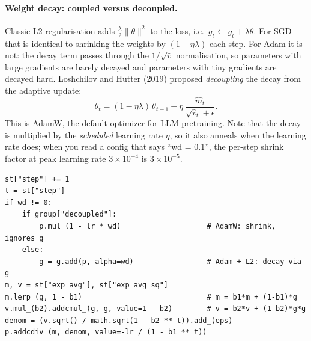 \paragraph{Weight decay: coupled versus decoupled.} Classic L2 regularisation adds
$\tfrac{\lambda}{2}\|\theta\|^2$ to the loss, i.e.\ $g_t\leftarrow g_t+\lambda\theta$. For SGD
that is identical to shrinking the weights by $(1-\eta\lambda)$ each step. For Adam it is not:
the decay term passes through the $1/\sqrt{\hat v}$ normalisation, so parameters with large
gradients are barely decayed and parameters with tiny gradients are decayed hard. Loshchilov and
Hutter (2019) proposed \emph{decoupling} the decay from the adaptive update:
\begin{equation}
\theta_t = (1-\eta\lambda)\,\theta_{t-1} - \eta\,\frac{\hat m_t}{\sqrt{\hat v_t}+\epsilon}.
\label{eq:optim:adamw}
\end{equation}
This is AdamW, the default optimizer for LLM pretraining. Note that the decay is multiplied by
the \emph{scheduled} learning rate $\eta$, so it also anneals when the learning rate does; when
you read a config that says ``wd = 0.1'', the per-step shrink factor at peak learning rate
$3\times10^{-4}$ is $3\times10^{-5}$.

\begin{lstlisting}[caption={The AdamW update for one parameter tensor (loop path of \texttt{llmsys.optim.AdamW}). It matches \texttt{torch.optim.AdamW} exactly, including the placement of $\epsilon$ after the bias-corrected square root.},label={lst:optim:adamw}]
st["step"] += 1
t = st["step"]
if wd != 0:
    if group["decoupled"]:
        p.mul_(1 - lr * wd)                    # AdamW: shrink, ignores g
    else:
        g = g.add(p, alpha=wd)                 # Adam + L2: decay via g
m, v = st["exp_avg"], st["exp_avg_sq"]
m.lerp_(g, 1 - b1)                             # m = b1*m + (1-b1)*g
v.mul_(b2).addcmul_(g, g, value=1 - b2)        # v = b2*v + (1-b2)*g*g
denom = (v.sqrt() / math.sqrt(1 - b2 ** t)).add_(eps)
p.addcdiv_(m, denom, value=-lr / (1 - b1 ** t))
\end{lstlisting}

